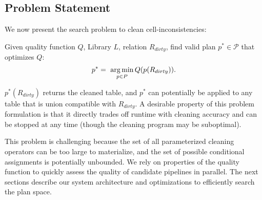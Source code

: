 



\subsection{Problem Statement}
We now present the search problem to clean cell-inconsistencies:
\begin{problem}%
Given quality function $Q$, Library $L$, relation $R_{dirty}$, find valid plan $p^* \in \mathcal{P}$ that optimizes $Q$:
\[
p^* = ~ \operatorname*{arg\,min}_{p \in P} Q( p(R_{dirty}) ).  
\]
\end{problem}
$p^*(R_{dirty})$ returns the cleaned table, and $p^*$ can potentially be applied to any table that is union compatible with $R_{dirty}$.  A desirable property of this problem formulation is that it directly trades off runtime with cleaning accuracy and can be stopped at any time (though the cleaning program may be suboptimal).

This problem is challenging because the set of all parameterized cleaning operators can be too large to materialize, and the set of possible conditional assignments is potentially unbounded.  We  rely on properties of the quality function to quickly assess the quality of candidate pipelines in parallel. The next sections describe our system architecture and optimizations to efficiently search the plan space.



